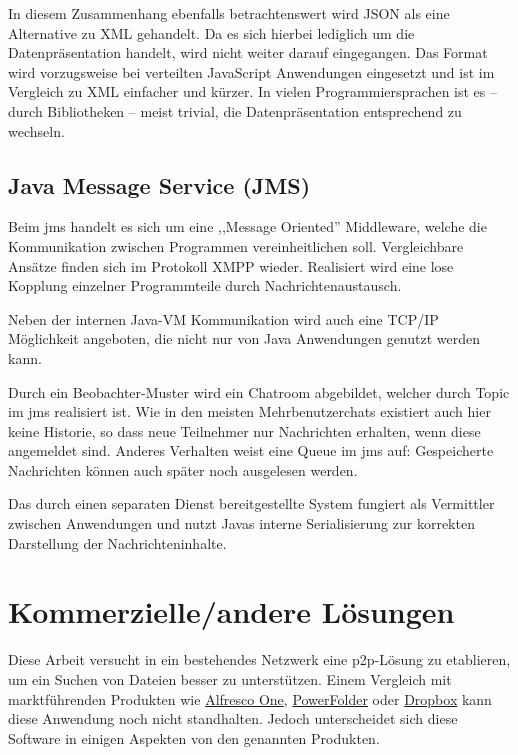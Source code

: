 \documentclass[oneside, ngerman, toc=bibliography,bibliography=totoc,listof=entryprefix, open=right,numbers=noenddot,fontsize=12pt]{scrbook}
\begin{document}
In diesem Zusammenhang ebenfalls betrachtenswert wird {JSON} als eine Alternative zu {XML} gehandelt. Da es sich hierbei lediglich um die Datenpräsentation handelt, wird nicht weiter darauf eingegangen. Das Format wird vorzugsweise bei verteilten JavaScript Anwendungen eingesetzt und ist im Vergleich zu {XML} einfacher und kürzer. In vielen Programmiersprachen ist es -- durch Bibliotheken -- meist trivial, die Datenpräsentation entsprechend zu wechseln.


\subsection{Java Message Service (JMS)}
\label{chap:jms}
Beim \acrfull{jms} handelt es sich um eine ,,Message Oriented'' Middleware, welche die Kommunikation zwischen Programmen vereinheitlichen soll. Vergleichbare Ansätze finden sich im Protokoll XMPP wieder. Realisiert wird eine lose Kopplung einzelner Programmteile durch Nachrichtenaustausch.

Neben der internen Java-VM Kommunikation wird auch eine {TCP/IP} Möglichkeit angeboten, die nicht nur von Java Anwendungen genutzt werden kann.

Durch ein Beobachter-Muster  wird ein Chatroom abgebildet, welcher durch Topic im  \acrshort{jms} realisiert ist.
Wie in den meisten Mehrbenutzerchats existiert auch hier keine Historie, so dass neue Teilnehmer nur Nachrichten erhalten, wenn diese angemeldet sind.
Anderes Verhalten weist eine Queue im \acrshort{jms} auf: Gespeicherte Nachrichten können auch später noch ausgelesen werden.

Das durch einen separaten Dienst bereitgestellte System fungiert als Vermittler zwischen Anwendungen und nutzt Javas interne Serialisierung zur korrekten Darstellung der Nachrichteninhalte.
 


\section{Kommerzielle/andere Lösungen}
Diese Arbeit versucht in ein bestehendes Netzwerk eine \acrshort{p2p}-Lösung zu etablieren, um ein Suchen von Dateien besser zu unterstützen. Einem Vergleich mit marktführenden Produkten wie  \href{http://www.alfresco.com/}{{Alfresco One}}, \href{https://www.powerfolder.com/de/powerfolder-erhalt-qualitatssiegel-it-security-made-in-germany/}{{PowerFolder}} oder \href{https://www.dropbox.com/de/}{{Dropbox}} kann diese Anwendung noch nicht standhalten.
Jedoch unterscheidet sich diese Software in einigen Aspekten von den genannten Produkten.
\end{document}
